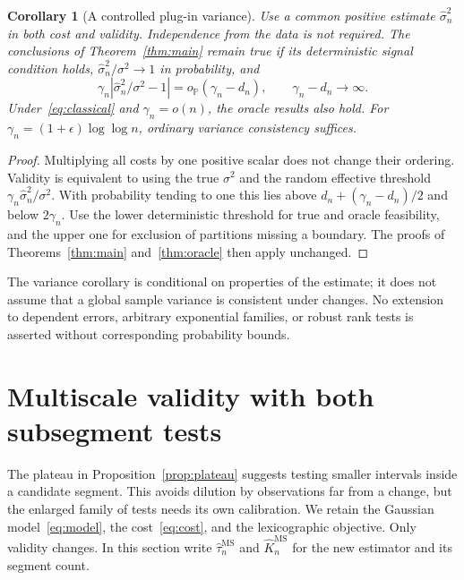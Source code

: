 \documentclass[pdflatex,sn-mathphys-num]{sn-jnl}
\newcommand{\Prob}{\mathbb P}
\newcommand{\op}{o_{\Prob}}
\theoremstyle{thmstyleone}
\newtheorem{corollary}[theorem]{Corollary}
\theoremstyle{thmstyletwo}
\begin{document}
\begin{corollary}[A controlled plug-in variance]\label{cor:variance}
Use a common positive estimate $\widehat\sigma_n^2$ in both cost and validity.
Independence from the data is not required. The conclusions of
Theorem~\ref{thm:main} remain true if its deterministic signal condition holds,
$\widehat\sigma_n^2/\sigma^2\to1$ in probability, and
\begin{equation}\label{eq:variance-margin}
\gamma_n\left|\widehat\sigma_n^2/\sigma^2-1\right|
=\op(\gamma_n-d_n),\qquad \gamma_n-d_n\to\infty.
\end{equation}
Under~\eqref{eq:classical} and $\gamma_n=o(n)$, the oracle results also hold.
For $\gamma_n=(1+\epsilon)\log\log n$, ordinary variance consistency suffices.
\end{corollary}
\begin{proof}
Multiplying all costs by one positive scalar does not change their ordering.
Validity is equivalent to using the true $\sigma^2$ and the random effective
threshold $\gamma_n\widehat\sigma_n^2/\sigma^2$.
With probability tending to one this lies above
$d_n+(\gamma_n-d_n)/2$ and below $2\gamma_n$.
Use the lower deterministic threshold for true and oracle feasibility,
and the upper one for exclusion of partitions missing a boundary.
The proofs of Theorems~\ref{thm:main} and~\ref{thm:oracle} then apply unchanged.
\end{proof}

The variance corollary is conditional on properties of the estimate; it does
not assume that a global sample variance is consistent under changes.
No extension to dependent errors, arbitrary exponential families, or robust
rank tests is asserted without corresponding probability bounds.

\section{Multiscale validity with both subsegment tests}\label{sec:multiscale}

The plateau in Proposition~\ref{prop:plateau} suggests testing smaller intervals
inside a candidate segment. This avoids dilution by observations far from a
change, but the enlarged family of tests needs its own calibration. We retain
the Gaussian model~\eqref{eq:model}, the cost~\eqref{eq:cost}, and the
lexicographic objective. Only validity changes. In this section write
$\widehat\tau_n^{\mathrm{MS}}$ and $\widehat K_n^{\mathrm{MS}}$ for the new
estimator and its segment count.
\end{document}
